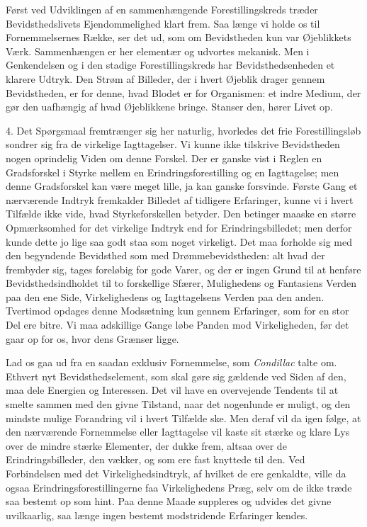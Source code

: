 \documentclass[12pt,a4paper,openany]{book}
\newcommand{\opage}[1]{\marginnote{\footnotesize\textit{[#1]}}}
\begin{document}
Først ved Udviklingen af en sammenhængende Forestillingskreds træder
Bevidsthedslivets Ejendommelighed klart frem. Saa længe vi holde os til
Fornemmelsernes Række, ser det ud, som om Bevidstheden kun var
Øjeblikkets Værk. Sammenhængen er her elementær og udvortes mekanisk.
Men i Genkendelsen og i den stadige Forestillingskreds har
Bevidsthedsenheden et klarere Udtryk. Den Strøm af Billeder, der i hvert
Øjeblik drager gennem Bevidstheden, er for denne, hvad Blodet er for
Organismen: et indre Medium, der gør den uafhængig af hvad Øjeblikkene
bringe. Stanser den, hører Livet op.

4. Det Spørgsmaal fremtrænger sig her naturlig, hvorledes det frie
Forestillingsløb sondrer sig fra de virkelige Iagttagelser. Vi kunne
ikke tilskrive Bevidstheden nogen oprindelig Viden om denne Forskel. Der
er ganske vist i Reglen en Gradsforskel i Styrke mellem en
Erindringsforestilling og en Iagttagelse; men denne Gradsforskel kan
være meget lille, ja kan ganske forsvinde. Første Gang et nærværende
Indtryk fremkalder Billedet af tidligere Erfaringer, kunne vi i hvert
Tilfælde ikke vide, hvad Styrkeforskellen betyder. Den betinger maaske
en større Opmærksomhed for det virkelige Indtryk end
\opage{160}for Erindringsbilledet; men derfor kunde dette jo lige saa
godt staa som noget virkeligt. Det maa forholde sig med den begyndende
Bevidsthed som med Drømmebevidstheden: alt hvad der frembyder sig, tages
foreløbig for gode Varer, og der er ingen Grund til at henføre
Bevidsthedsindholdet til to forskellige Sfærer, Mulighedens og
Fantasiens Verden paa den ene Side, Virkelighedens og Iagttagelsens
Verden paa den anden. Tvertimod opdages denne Modsætning kun gennem
Erfaringer, som for en stor Del ere bitre. Vi maa adskillige Gange løbe
Panden mod Virkeligheden, før det gaar op for os, hvor dens Grænser
ligge.

Lad os gaa ud fra en saadan exklusiv Fornemmelse, som \emph{Condillac}
talte om. Ethvert nyt Bevidsthedselement, som skal gøre sig gældende ved
Siden af den, maa dele Energien og Interessen. Det vil have en
overvejende Tendents til at smelte sammen med den givne Tilstand, naar
det nogenlunde er muligt, og den mindste mulige Forandring vil i hvert
Tilfælde ske. Men deraf vil da igen følge, at den nærværende Fornemmelse
eller Iagttagelse vil kaste sit stærke og klare Lys over de mindre
stærke Elementer, der dukke frem, altsaa over de Erindringsbilleder, den
vækker, og som ere fast knyttede til den. Ved Forbindelsen med det
Virkelighedsindtryk, af hvilket de ere genkaldte, ville da ogsaa
Erindringsforestillingerne faa Virkelighedens Præg, selv om de ikke
træde saa bestemt op som hint. Paa denne Maade suppleres og udvides det
givne uvilkaarlig, saa længe ingen bestemt modstridende Erfaringer
kendes.
\end{document}

